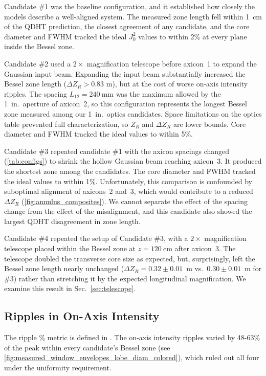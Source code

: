 \documentclass[
  aps,
  twocolumn,
  reprint,              %
  superscriptaddress,
  amsmath,
  amssymb,
  floatfix,
  longbibliography,      %
  nofootinbib %
]{revtex4-2}
\begin{document}
Candidate \#1 was the baseline configuration, and it established how closely the models describe a well-aligned system. The measured zone length fell within \SI{1}{\centi\meter} of the QDHT prediction, the closest agreement of any candidate, and the core diameter and FWHM tracked the ideal $J_0^2$ values to within 2\% at every plane inside the Bessel zone.

Candidate \#2 used a $2\times$ magnification telescope before axicon~1 to expand the Gaussian input beam. Expanding the input beam substantially increased the Bessel zone length ($\Delta Z_R > 0.83$ m), but at the cost of worse on-axis intensity ripples.
The spacing $L_{12} = \SI{240}{\milli\meter}$ was the maximum allowed by the 1~in.\ aperture of axicon~2, so this configuration represents the longest Bessel zone measured among our 1~in.\ optics candidates. Space limitations on the optics table prevented full characterization, so $Z_R$ and $\Delta Z_R$ are lower bounds. Core diameter and FWHM tracked the ideal values to within 5\%.

Candidate \#3 repeated candidate \#1 with the axicon spacings changed (\autoref{tab:configs}) to shrink the hollow Gaussian beam reaching axicon~3. It produced the shortest zone among the candidates. The core diameter and FWHM tracked the ideal values to within 1\%. Unfortunately, this comparison is confounded by suboptimal alignment of axicons~2 and~3, which would contribute to a reduced $\Delta Z_R$ (\autoref{fig:annulus_composites}). We cannot separate the effect of the spacing change from the effect of the misalignment, and this candidate also showed the largest QDHT disagreement in zone length.

Candidate \#4 repeated the setup of Candidate \#3, with a $2\times$ magnification telescope placed within the Bessel zone at $z = \SI{120}{\centi\meter}$ after axicon~3. The telescope doubled the transverse core size as expected, but,
surprisingly, left the Bessel zone length nearly unchanged
($\Delta Z_R = 0.32 \pm 0.01$~m vs.\ $0.30 \pm 0.01$~m for \#3) rather
than stretching it by the expected longitudinal magnification. We
examine this result in Sec.~\ref{sec:telescope}.


\subsection{Ripples in On-Axis Intensity}
The ripple \% metric is defined in . The on-axis intensity ripples varied by 48-63\% of the peak within every candidate's Bessel zone (see \autoref{fig:measured_window_envelopes_lobe_diam_colored}), which ruled out all four under the uniformity requirement.
\end{document}
